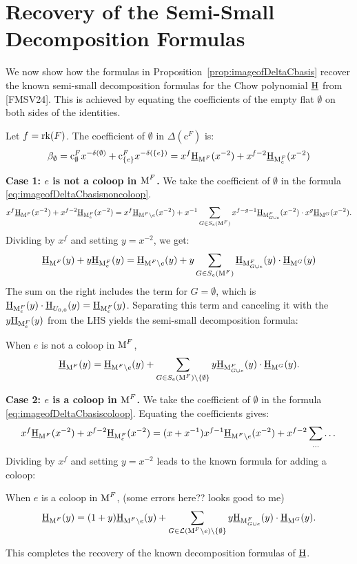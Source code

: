 \documentclass[11pt]{article}
\newcommand{\chow}{\normalfont\text{\underline{H}}}
\newcommand{\rank}{\normalfont\text{rk}}
\newcommand{\M}{\normalfont\text{M}}
\newcommand{\Ebasis}[1]{\mathrm{#1}}
\newcommand{\Cbasis}[1]{\mathrm{c}^{#1}}
\newcommand{\CbasisSub}[2]{\mathrm{c}^{#1}_{#2}}
\theoremstyle{remark}
\begin{document}
\section{Recovery of the Semi-Small Decomposition Formulas}

We now show how the formulas in Proposition~\ref{prop:imageofDeltaCbasis} recover the known
semi-small decomposition formulas for the Chow polynomial \(\chow\) from [FMSV24]. This
is achieved by equating the coefficients of the empty flat \(\Ebasis{\emptyset}\) on both sides of the identities.

Let \(f = \rank(F)\). The coefficient of \(\Ebasis{\emptyset}\) in \(\Delta(\Cbasis{F})\) is:
\[ \beta_\emptyset = \CbasisSub{F}{\emptyset}x^{-\delta(\emptyset)} + \CbasisSub{F}{\{e\}}x^{-\delta(\{e\})} = x^f \chow_{\M^F}(x^{-2}) + x^{f-2}\chow_{\M^F_e}(x^{-2}) \]

\textbf{Case 1: \(e\) is not a coloop in \(\M^F\).}
We take the coefficient of \(\Ebasis{\emptyset}\) in the formula \eqref{eq:imageofDeltaCbasisnoncoloop}.
\[ x^{f}\chow_{\M^F}(x^{-2}) + x^{f-2}\chow_{\M^F_e}(x^{-2}) = x^{f}\chow_{\M^F\setminus e}(x^{-2}) +
    x^{-1}\sum_{G \in S_e(\M^F)}x^{f-g-1}\chow_{\M^F_{G\cup e}}(x^{-2})\cdot x^g\chow_{\M^G}(x^{-2}). \]
Dividing by \(x^f\) and setting \(y=x^{-2}\), we get:
\[ \chow_{\M^F}(y) + y\chow_{\M^F_e}(y) = \chow_{\M^F\setminus e}(y) + y\sum_{G \in S_e(\M^F)}\chow_{\M^F_{G\cup e}}(y)\cdot \chow_{\M^G}(y)\]
The sum on the right includes the term for \(G=\emptyset\), which is \(\chow_{\M^F_e}(y) \cdot \chow_{U_{0,0}}(y) = \chow_{\M^F_e}(y)\). Separating this term and canceling it with the \(y\chow_{\M^F_e}(y)\) from the LHS yields the semi-small decomposition formula:
\begin{tcolorbox}
    When \(e\) is not a coloop in \(\M^F\),
    \begin{equation} \label{eq:semi-small-decomposition-noncoloop}
        \chow_{\M^F}(y) = \chow_{\M^F\setminus e}(y) + \sum_{G \in S_e(\M^F)\setminus\{\emptyset\}} y \chow_{\M^F_{G\cup e}}(y) \cdot \chow_{\M^G}(y).
    \end{equation}
\end{tcolorbox}

\textbf{Case 2: \(e\) is a coloop in \(\M^F\).}
We take the coefficient of \(\Ebasis{\emptyset}\) in the formula \eqref{eq:imageofDeltaCbasiscoloop}.
Equating the coefficients gives:
\[ x^f \chow_{\M^F}(x^{-2}) + x^{f-2}\chow_{\M^F_e}(x^{-2}) = (x+x^{-1})x^{f-1}\chow_{\M^F\setminus e}(x^{-2}) + x^{f-2}\sum_{\dots} \dots \]
Dividing by \(x^f\) and setting \(y=x^{-2}\) leads to the known formula for adding a coloop:
\begin{tcolorbox}
    When \(e\) is a coloop in \(\M^F\), (some errors here?? looks good to me)
    \begin{equation} \label{eq:semi-small-decomposition-coloop}
        \chow_{\M^F}(y) = (1+y)\chow_{\M^F\setminus e}(y) +
        \sum_{G \in \mathcal{L}(\M^F\setminus e)\setminus\{\emptyset\}}y \chow_{\M^F_{G\cup e}}(y) \cdot
        \chow_{\M^G}(y).
    \end{equation}
\end{tcolorbox}
This completes the recovery of the known decomposition formulas of \(\chow\).
\end{document}
